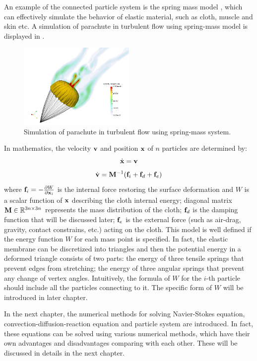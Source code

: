 An example of the connected particle system is the spring mass model \cite{blickhan1989spring}, which can effectively simulate the behavior of elastic material, such as cloth\cite{Baraff1998Large}, muscle \cite{NedelReal1998} and skin\cite{GelderApproximate1998} etc. A simulation of parachute in turbulent flow using spring-mass model is displayed in . 
\begin{figure}
\centering
\includegraphics[width=0.5\textwidth]{Figures/parachute_turb.jpg} 
\caption{Simulation of parachute in turbulent flow using spring-mass system.} 
\label{fig:spring_mesh}
\end{figure}
In mathematics, the velocity $\mathbf{v}$ and position $\mathbf{x}$ of $n$ particles are determined by:
\begin{equation}
\dot{\mathbf{x}} = \mathbf{v}
\label{spring_x_eqn}
\end{equation}
\begin{equation}
\dot{\mathbf{v}} = \mathbf{M}^{-1}(\mathbf{f}_i
				+ \mathbf{f}_d + \mathbf{f}_e \label{spring_v_eqn})
\end{equation}
where $\mathbf{f}_i = -\frac{\partial W}{\partial \mathbf{x}_i}$ is the internal force restoring the surface deformation and $W$ is a scalar function of $\mathbf{x}$ describing the cloth internal energy; diagonal matrix $\mathbf{M} \in \mathbb{R}^{3n\times 3n}$ represents the mass distribution of the cloth; $\mathbf{f}_d$ is the damping function that will be discussed later; $\mathbf{f}_e$ is the external force (such as air-drag, gravity, contact constrains, etc.) acting on the cloth. This model is well defined if the energy function $W$ for each mass point is specified. In fact, the elastic membrane can be discretized into triangles and then the potential energy in a deformed triangle consists of two parts: the energy of three tensile springs that prevent edges from stretching; the energy of three angular springs that prevent any change of vertex angles. Intuitively, the formula of $W$ for the $i$-th particle should include all the particles connecting to it. The specific form of $W$ will be introduced in later chapter.

In the next chapter, the numerical methods for solving Navier-Stokes equation, convection-diffusion-reaction equation and particle system are introduced. In fact, these equations can be solved using various numerical methods, which have their own advantages and disadvantages comparing with each other. These will be discussed in details in the next chapter.
